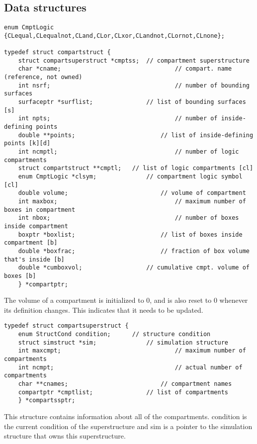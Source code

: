 \documentclass {book}
\begin{document}
\subsection*{Data structures}

\begin{lstlisting}
enum CmptLogic {CLequal,CLequalnot,CLand,CLor,CLxor,CLandnot,CLornot,CLnone};

typedef struct compartstruct {
	struct compartsuperstruct *cmptss;	// compartment superstructure
	char *cname;								// compart. name (reference, not owned)
	int nsrf;									// number of bounding surfaces
	surfaceptr *surflist;				// list of bounding surfaces [s]
	int npts;									// number of inside-defining points
	double **points;						// list of inside-defining points [k][d]
	int ncmptl;									// number of logic compartments
	struct compartstruct **cmptl;	// list of logic compartments [cl]
	enum CmptLogic *clsym;				// compartment logic symbol [cl]
	double volume;							// volume of compartment
	int maxbox;									// maximum number of boxes in compartment
	int nbox;									// number of boxes inside compartment
	boxptr *boxlist;						// list of boxes inside compartment [b]
	double *boxfrac;						// fraction of box volume that's inside [b]
	double *cumboxvol;					// cumulative cmpt. volume of boxes [b]
	} *compartptr;
\end{lstlisting}

The volume of a compartment is initialized to 0, and is also reset to 0 whenever its definition changes.  This indicates that it needs to be updated.

\begin{lstlisting}
typedef struct compartsuperstruct {
	enum StructCond condition;		// structure condition
	struct simstruct *sim;				// simulation structure
	int maxcmpt;								// maximum number of compartments
	int ncmpt;									// actual number of compartments
	char **cnames;							// compartment names
	compartptr *cmptlist;				// list of compartments
	} *compartssptr;
\end{lstlisting}

This structure contains information about all of the compartments.  condition is the current condition of the superstructure and sim is a pointer to the simulation structure that owns this superstructure.
\end{document}
